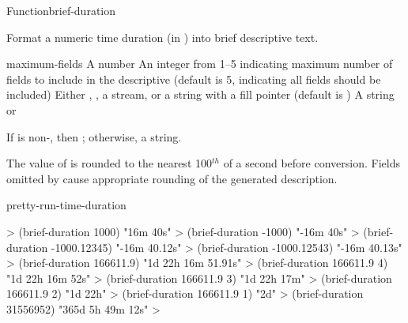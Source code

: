 \documentclass[10pt,twoside,english,pdftex]{article}
\begin{document}

\begin{functiondoc}{Function}{brief-duration}{%
    }
% 

\fnsyntax

\fnpurpose Format a numeric time duration (in ) into
brief descriptive text.

\fnpackage {}

\fnmodule {}

\fnargs
\begin{args}{maximum-fields}
\arg[seconds] A number
 An integer from 1--5 indicating maximum number of fields 
to include in the descriptive  (default is 5, indicating all 
fields should be included)
\arg[destination] Either \nil, , a stream, or a string with a fill 
pointer (default is \nil)
\arg[result] A string or \nil{}
\end{args}

\fnreturns If  is non-\nil, then \nil; otherwise, a string.

\fndescription The value of  is rounded to the nearest
100$^{th}$ of a second before conversion.  Fields omitted by
 cause appropriate rounding of the generated
description.

\begin{alsos}{pretty-run-time-duration}
\end{alsos}

\fnexamples
%
\W\supp
\begin{example}
  > (brief-duration 1000)
  "16m 40s"
  > (brief-duration -1000)
  "-16m 40s"
  > (brief-duration -1000.12345)
  "-16m 40.12s"
  > (brief-duration -1000.12543)
  "-16m 40.13s"\goodpagebreak
  > (brief-duration 166611.9)
  "1d 22h 16m 51.91s"
  > (brief-duration 166611.9 4)
  "1d 22h 16m 52s"
  > (brief-duration 166611.9 3)
  "1d 22h 17m"
  > (brief-duration 166611.9 2)
  "1d 22h"
  > (brief-duration 166611.9 1)
  "2d"
  > (brief-duration 31556952)
  "365d 5h 49m 12s"
  >
\end{example}

\end{functiondoc}
\end{document}
